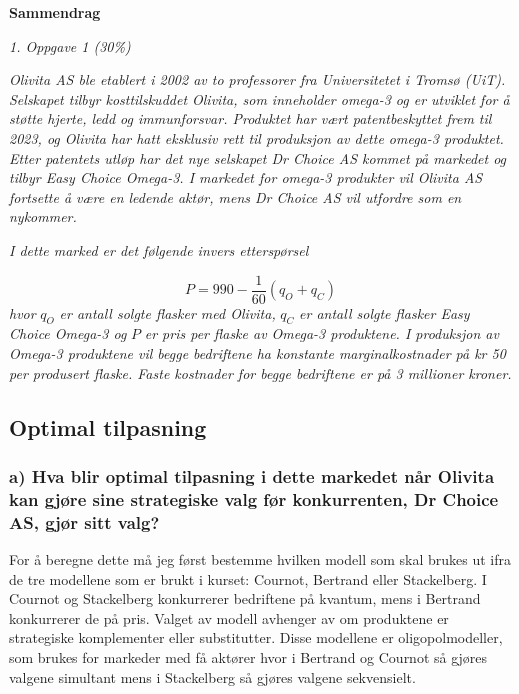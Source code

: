 \documentclass[
  12pt,
  a4paper,
  DIV=11,
  numbers=noendperiod]{scrartcl}
\renewcommand*\contentsname{Table of contents}
\newcommand\contentsname{Table of contents}
\begin{document}
\begin{center}
    \Large
    \textbf{Sammendrag}
\end{center}


\newpage
\hypersetup{linkcolor=black}
\renewcommand{\contentsname}{Innholdsfortegnelse}
\renewcommand*{\figureautorefname}{Figur}
\renewcommand*{\tableautorefname}{Tabell}
\tableofcontents
\listoffigures
\listoftables
\hypersetup{linkcolor=blue}
\newpage

\begin{center}
    \Large
    \textit{1.  Oppgave 1 (30\%)}
\end{center}

\textit{Olivita AS ble etablert i 2002 av to professorer fra Universitetet i Tromsø (UiT). Selskapet tilbyr kosttilskuddet Olivita, som inneholder omega-3 og er utviklet for å støtte hjerte, ledd og immunforsvar. Produktet har vært patentbeskyttet frem til 2023, og Olivita har hatt eksklusiv rett til produksjon av dette omega-3 produktet. Etter patentets utløp har det nye selskapet Dr Choice AS kommet på markedet og tilbyr Easy Choice Omega-3. I markedet for omega-3 produkter vil Olivita AS fortsette å være en ledende aktør, mens Dr Choice AS vil utfordre som en nykommer.}

\textit{I dette marked er det følgende invers etterspørsel}

$$
P = 990 - \frac{1}{60}(q_O + q_C)
$$ 
\textit{hvor} $q_O$ \textit{er antall solgte flasker med Olivita,} $q_C$ \textit{er antall solgte flasker Easy Choice Omega-3 og} $P$ \textit{er pris per flaske av Omega-3 produktene. I produksjon av Omega-3 produktene vil begge bedriftene ha konstante marginalkostnader på kr 50 per produsert flaske. Faste kostnader for begge bedriftene er på 3 millioner kroner.}

\subsection{Optimal tilpasning}\label{optimal-tilpasning}

\subsubsection{a) Hva blir optimal tilpasning i dette markedet når Olivita kan gjøre sine strategiske valg før konkurrenten, Dr Choice AS, gjør sitt valg?}\label{a-hva-blir-optimal-tilpasning-i-dette-markedet-nuxe5r-olivita-kan-gjuxf8re-sine-strategiske-valg-fuxf8r}

For å beregne dette må jeg først bestemme hvilken modell som skal brukes
ut ifra de tre modellene som er brukt i kurset: Cournot, Bertrand eller
Stackelberg. I Cournot og Stackelberg konkurrerer bedriftene på kvantum,
mens i Bertrand konkurrerer de på pris. Valget av modell avhenger av om
produktene er strategiske komplementer eller substitutter. Disse
modellene er oligopolmodeller, som brukes for markeder med få aktører
hvor i Bertrand og Cournot så gjøres valgene simultant mens i
Stackelberg så gjøres valgene sekvensielt.
\end{document}
